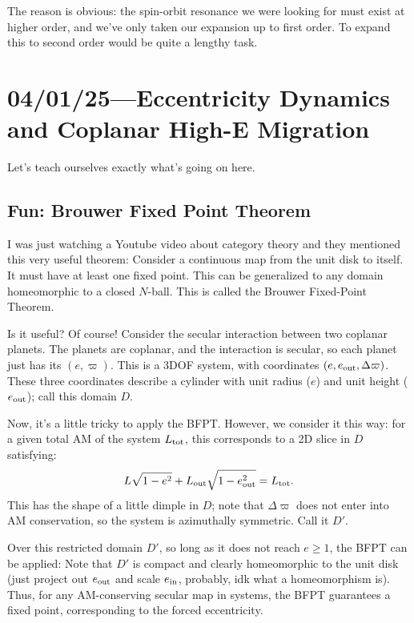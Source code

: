 \documentclass[12pt]{article}
\begin{document}
The reason is obvious: the spin-orbit resonance we were looking for must exist
at higher order, and we've only taken our expansion up to first order.
To expand this to second order would be quite a lengthy task.

\section{04/01/25---Eccentricity Dynamics and Coplanar High-E Migration}

Let's teach ourselves exactly what's going on here.

\subsection{Fun: Brouwer Fixed Point Theorem}

I was just watching a Youtube video about category theory and they mentioned
this very useful theorem:
Consider a continuous map from the unit disk to itself.
It must have at least one fixed point.
This can be generalized to any domain homeomorphic to a closed $N$-ball.
This is called the Brouwer Fixed-Point Theorem.

Is it useful?
Of course!
Consider the secular interaction between two coplanar planets.
The planets are coplanar, and the interaction is secular, so each planet just
has its $(e, \varpi)$.
This is a 3DOF system, with coordinates $(e, e_{\rm out}, \Delta \varpi)$.
These three coordinates describe a cylinder with unit radius ($e$) and unit
height ($e_{\rm out}$); call this domain $D$.

Now, it's a little tricky to apply the BFPT\@.
However, we consider it this way: for a given total AM of the system $L_{\rm
tot}$, this corresponds to a 2D slice in $D$ satisfying:
\begin{align}
    L\sqrt{1 - e^2} + L_{\rm out}\sqrt{1 - e_{\rm out}^2} = L_{\rm tot}.
\end{align}
This has the shape of a little dimple in $D$; note that $\Delta \varpi$ does not
enter into AM conservation, so the system is azimuthally symmetric.
Call it $D'$.

Over this restricted domain $D'$, so long as it does not reach $e \geq 1$, the
BFPT can be applied:
Note that $D'$ is compact and clearly homeomorphic to the unit disk (just
project out $e_{\rm out}$ and scale $e_{\rm in}$, probably, idk what a
homeomorphism is).
Thus, for any AM-conserving secular map in systems, the BFPT guarantees a fixed
point, corresponding to the forced eccentricity.
\end{document}
